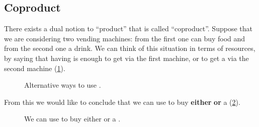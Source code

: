 \label{sec:coproductset}
\subsection{Coproduct}

There exists a dual notion to ``product'' that is called ``coproduct''. Suppose that we are considering two vending machines: from the first one can buy food and from the second one a drink. We can think of this situation in terms of resources, by saying that having  is enough to get  via the first machine, or to get a  via the second machine (\cref{fig:vending_1}).

\begin{figure}[h!]
    \centering
    \caption{Alternative ways to use . \label{fig:vending_1}}
\end{figure}

From this we would like to conclude that we can use  to buy \textbf{either}  \textbf{or} a  (\cref{fig:vending_2}).

\begin{figure}[h!]
    \centering
    \caption{We can use  to buy either  or a .\label{fig:vending_2}}
\end{figure}

\begin{comment}
Suppose that we are considering a hybrid car that contains two engines: an
electric engine and an internal combustion engine. Both can produce \textsf{motion}, but each from a different source of energy. The electric engine uses \textsf{electric energy}; the internal combustion engine uses \textsf{gasoline}. The situation is as in \cref{fig:e16a}.

\begin{figure}[h!]
    \centering
    \includesag{30_dpcatfig_e14}
    \caption{Alternative ways to generate $\mathsf{motion}$. \label{fig:e16a}}
\end{figure}

From this we would like to conclude that we can obtain \textsf{motion} from \textbf{either} \textsf{gasoline} \textbf{or} \textsf{electric energy} (\cref{fig:e16b}).

\begin{figure}[h!]
    \centering
    \includesag{30_dpcatfig_e15}
    \caption{We can generate $\mathsf{motion}$ from either $\mathsf{gasoline}$ or $\mathsf{electric} \ \mathsf{energy}$. \label{fig:e16b}}
\end{figure}
\end{comment}


